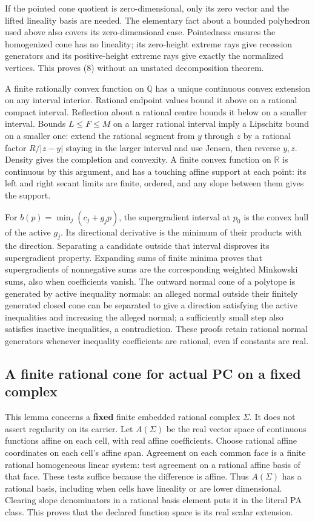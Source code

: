 \documentclass[
  11pt,
]{article}
\begin{document}
If the pointed cone quotient is zero-dimensional, only its zero vector
and the lifted lineality basis are needed. The elementary fact about a
bounded polyhedron used above also covers its zero-dimensional case.
Pointedness ensures the homogenized cone has no lineality; its
zero-height extreme rays give recession generators and its
positive-height extreme rays give exactly the normalized vertices. This
proves (8) without an unstated decomposition theorem.

A finite rationally convex function on \(\mathbb{Q}\) has a unique
continuous convex extension on any interval interior. Rational endpoint
values bound it above on a rational compact interval. Reflection about a
rational centre bounds it below on a smaller interval. Bounds
\(L\leq F\leq M\) on a larger rational interval imply a Lipschitz bound
on a smaller one: extend the rational segment from \(y\) through \(z\)
by a rational factor \(R/|z-y|\) staying in the larger interval and use
Jensen, then reverse \(y,z\). Density gives the completion and
convexity. A finite convex function on \(\mathbb{R}\) is continuous by
this argument, and has a touching affine support at each point: its left
and right secant limits are finite, ordered, and any slope between them
gives the support.

For \(b(p)=\min_j(c_j+g_jp)\), the supergradient interval at \(p_0\) is
the convex hull of the active \(g_j\). Its directional derivative is the
minimum of their products with the direction. Separating a candidate
outside that interval disproves its supergradient property. Expanding
sums of finite minima proves that supergradients of nonnegative sums are
the corresponding weighted Minkowski sums, also when coefficients
vanish. The outward normal cone of a polytope is generated by active
inequality normals: an alleged normal outside their finitely generated
closed cone can be separated to give a direction satisfying the active
inequalities and increasing the alleged normal; a sufficiently small
step also satisfies inactive inequalities, a contradiction. These proofs
retain rational normal generators whenever inequality coefficients are
rational, even if constants are real.

\subsection{A finite rational cone for actual PC on a fixed
complex}\label{a-finite-rational-cone-for-actual-pc-on-a-fixed-complex}

This lemma concerns a \textbf{fixed} finite embedded rational complex
\(\Sigma\). It does not assert regularity on its carrier. Let
\(A(\Sigma)\) be the real vector space of continuous functions affine on
each cell, with real affine coefficients. Choose rational affine
coordinates on each cell's affine span. Agreement on each common face is
a finite rational homogeneous linear system: test agreement on a
rational affine basis of that face. These tests suffice because the
difference is affine. Thus \(A(\Sigma)\) has a rational basis, including
when cells have lineality or are lower dimensional. Clearing slope
denominators in a rational basis element puts it in the literal PA
class. This proves that the declared function space is its real scalar
extension.
\end{document}
